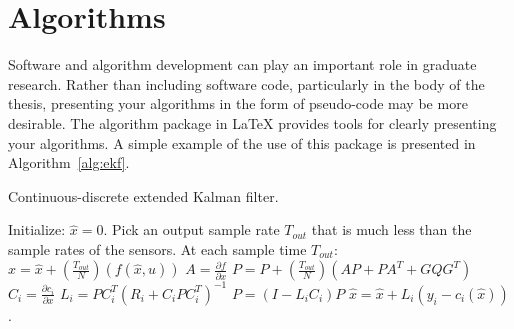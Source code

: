\section{Algorithms}
Software and algorithm development can play an important role in graduate research. Rather than including software code, particularly in the body of the thesis, presenting your algorithms in the form of pseudo-code may be more desirable. The {\ttfamily algorithm} package in \LaTeX{} provides tools for clearly presenting your algorithms. A simple example of the use of this package is presented in Algorithm~\ref{alg:ekf}.

\begin{algorithm}
	\caption{{\color{black} Continuous-discrete extended Kalman filter.}} \label{alg:ekf}
	\begin{algorithmic}[1]
	    \State Initialize:  $\hat{x} = 0$.
	    \State Pick an output sample rate $T_{\textit{out}}$ that is much less than
	    the sample rates of the sensors.
	    \State At each sample time $T_{\textit{out}}$:
	        \State $\hat{x} = \hat{x} + \left(\frac{T_{\textit{out}}}{N}\right) \left( f(\hat{x}, u)\right)$
	        \State $A = \frac{\partial{f}}{\partial{x}}$
	        \State $P = P + \left(\frac{T_{\textit{out}}}{N}\right)
	        \left(AP+PA^T + GQG^T\right)$
	    \EndFor
	        \State $C_i = \frac{\partial{c_i}}{\partial{x}}$
	        \State $L_i = PC_i^T(R_i+C_iPC_i^T)^{-1}$
	        \State $P = (I-L_iC_i)P$
	        \State $\hat{x} = \hat{x} +  L_i\left( y_i - c_i( \hat{x})
	        \right)$.
	    \EndIf
	\end{algorithmic}
\end{algorithm}

